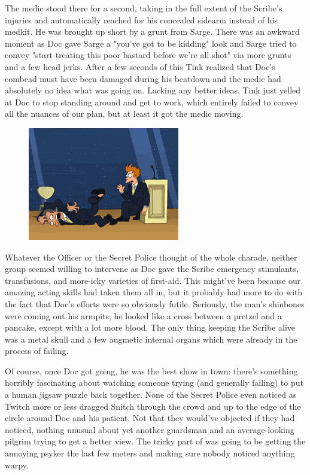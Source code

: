 The medic stood there for a second, taking in the full extent of the Scribe's injuries and automatically reached for his concealed sidearm instead of his medkit. 
He was brought up short by a grunt from Sarge. 
There was an awkward moment as Doc gave Sarge a "you've got to be kidding" look and Sarge tried to convey "start treating this poor bastard before we're all shot" via more grunts and a few head jerks. 
After a few seconds of this Tink realized that Doc's combead must have been damaged during his beatdown and the medic had absolutely no idea what was going on. 
Lacking any better ideas, Tink just yelled at Doc to stop standing around and get to work, which entirely failed to convey all the nuances of our plan, but at least it got the medic moving.

\begin{figure}
	\begin{center}
		\includegraphics[width=\figwidth]{pics/17/51.png}
	\end{center}
\end{figure}
Whatever the Officer or the Secret Police thought of the whole charade, neither group seemed willing to intervene as Doc gave the Scribe emergency stimulants, transfusions, and more-icky varieties of first-aid. 
This might've been because our amazing acting skills had taken them all in, but it probably had more to do with the fact that Doc's efforts were so obviously futile. 
Seriously, the man's shinbones were coming out his armpits; 
he looked like a cross between a pretzel and a pancake, except with a lot more blood. 
The only thing keeping the Scribe alive was a metal skull and a few augmetic internal organs which were already in the process of failing.

Of course, once Doc got going, he was the best show in town: 
there's something horribly fascinating about watching someone trying (and generally failing) to put a human jigsaw puzzle back together. 
None of the Secret Police even noticed as Twitch more or less dragged Snitch through the crowd and up to the edge of the circle around Doc and his patient. 
Not that they would've objected if they had noticed, nothing unusual about yet another guardsman and an average-looking pilgrim trying to get a better view. 
The tricky part of was going to be getting the annoying psyker the last few meters and making sure nobody noticed anything warpy. 



